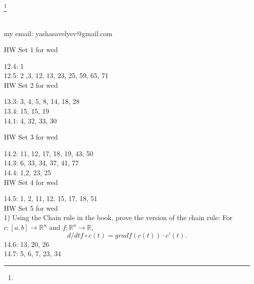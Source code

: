 \documentclass{amsart}
\numberwithin{equation}{section}
\theoremstyle{definition}
\theoremstyle{remark}
\begin{document}
\title{}
\author{Yasha Savelyev}
\thanks {}
\address{University of Colima, CUICBAS}
\keywords{}
\begin{abstract}   
\end{abstract}
\maketitle
\section{}
my email: yashasavelyev@gmail.com

HW Set 1 for wed

12.4: 1  \\
12.5: 2 ,3, 12, 13, 23, 25, 59, 65, 71  \\

HW Set 2 for wed

13.3: 3, 4, 5, 8, 14, 18, 28  \\
13.4: 15, 15, 19 \\
14.1: 4, 32, 33, 30

HW Set 3 for wed

14.2: 11, 12, 17, 18, 19, 43, 50 \\
14.3: 6, 33, 34, 37, 41, 77 \\
14.4: 1,2, 23, 25 \\

HW Set 4 for wed

14.5: 1, 2, 11, 12, 15, 17, 18, 51 \\

HW Set 5 for wed \\

1) Using the Chain rule in the book, prove the version of the chain rule:
For $c: [a,b] \to \mathbb{R} ^{n}$ and $f: \mathbb{R} ^{n}
\to \mathbb{R}$, $${d}/{dt} f \circ c (t)  = grad f (c (t)
) \cdot c' (t).$$ 
14.6: 13, 20, 26 \\
14.7: 5, 6, 7, 23, 34 \\
\end{document}
